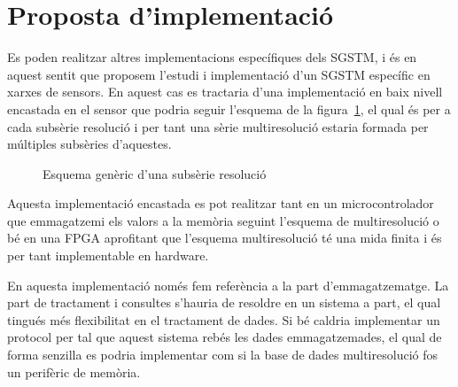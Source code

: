 \documentclass[paper=a4,parskip=half]{scrartcl}
\begin{document}
\section{Proposta d'implementació}

Es poden realitzar altres implementacions específiques dels SGSTM, i
és en aquest sentit que proposem l'estudi i implementació d'un SGSTM
específic en xarxes de sensors. En aquest cas es tractaria d'una
implementació en baix nivell encastada en el sensor que podria seguir
l'esquema de la figura~\ref{fig:vhdl:resolucio}, el qual és per a cada
subsèrie resolució i per tant una sèrie multiresolució estaria formada
per múltiples subsèries d'aquestes.


\begin{figure}[htp]
\centering

\caption{Esquema genèric d'una subsèrie resolució}
\label{fig:vhdl:resolucio}
\end{figure}

Aquesta implementació encastada es pot realitzar tant en un
microcontrolador que emmagatzemi els valors a la memòria seguint
l'esquema de multiresolució o bé en una FPGA aprofitant que l'esquema
multiresolució té una mida finita i és per tant implementable en
hardware. 

En aquesta implementació només fem referència a la part
d'emmagatzematge. La part de tractament i consultes s'hauria de
resoldre en un sistema a part, el qual tingués més flexibilitat en el
tractament de dades. Si bé caldria implementar un protocol per tal que
aquest sistema rebés les dades emmagatzemades, el qual de forma
senzilla es podria implementar com si la base de dades multiresolució
fos un perifèric de memòria.





\end{document}

